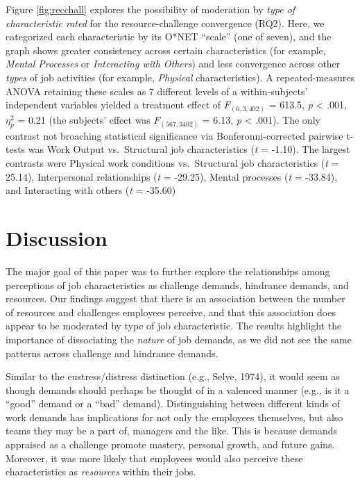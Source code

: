 \documentclass[
  man]{apa6}
\begin{document}
Figure \ref{fig:recchall} explores the possibility of moderation by \emph{type of characteristic rated} for the resource-challenge convergence (RQ2). Here, we categorized each characteristic by its O*NET ``scale'' (one of seven), and the graph shows greater consistency across certain characteristics (for example, \emph{Mental Processes} or \emph{Interacting with Others}) and less convergence across other \emph{types} of job activities (for example, \emph{Physical} characteristics). A repeated-measures ANOVA retaining these scales as 7 different levels of a within-subjects' independent variables yielded a treatment effect of \(F_{(6, 3,402)}\) = 613.5, \emph{p} \textless{} .001, \(\eta^2_{p}\) = 0.21 (the subjects' effect was \(F_{(567, 3402)}\) = 6.13, \emph{p} \textless{} .001). The only contrast not broaching statistical significance via Bonferonni-corrected pairwise t-tests was Work Output vs.~Structural job characteristics (\emph{t} = -1.10). The largest contrasts were Physical work conditions vs.~Structural job characteristics (\emph{t} = 25.14), Interpersonal relationships (\emph{t} = -29.25), Mental processes (\emph{t} = -33.84), and Interacting with others (\emph{t} = -35.60)

\hypertarget{discussion}{%
\section{Discussion}\label{discussion}}

The major goal of this paper was to further explore the relationships among perceptions of job characteristics as challenge demands, hindrance demands, and resources. Our findings suggest that there is an association between the number of resources and challenges employees perceive, and that this association does appear to be moderated by type of job characteristic. The results highlight the importance of dissociating the \emph{nature} of job demands, as we did not see the same patterns across challenge and hindrance demands.

Similar to the eustress/distress distinction (e.g., Selye, 1974), it would seem as though demands should perhaps be thought of in a valenced manner (e.g., is it a ``good'' demand or a ``bad'' demand). Distinguishing between different kinds of work demands has implications for not only the employees themselves, but also teams they may be a part of, managers and the like. This is because demands appraised as a challenge promote mastery, personal growth, and future gains. Moreover, it was more likely that employees would also perceive these characteristics as \emph{resources} within their jobs.
\end{document}
